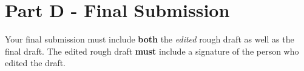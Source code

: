 \documentclass[12pt]{article} %
\begin{document}
  \section{Part D - Final Submission}
  Your final submission must include \textbf{both} the \textit{edited} rough draft as well as the final draft. The
  edited rough draft \textbf{must} include a signature of the person who edited the draft.
\end{document}
